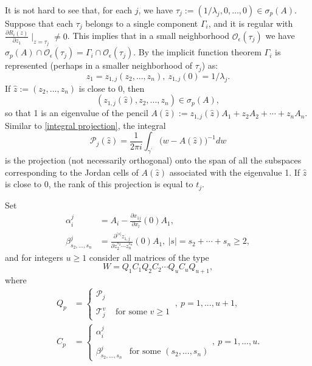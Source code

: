 \documentclass[draft, 12pt, reqno]{amsart}
\numberwithin{equation}{section}
\theoremstyle{plain}
\begin{document}
It is not hard to see that, for each $j$, we have $\tau_j:=(1/\lambda_j,0,\dots ,0)\in \sigma_p(A)$. Suppose that each $\tau_j$ belongs to a single component $\Gamma_i$, and it is regular with $\frac{\partial R_i(z)}{\partial z_1}\mid_{z=\tau_j} \neq 0$. This implies that in a small neighborhood ${\mathcal O}_\epsilon (\tau_j)$ we have $\sigma_p(A)\cap {\mathcal O}_\epsilon(\tau_j)=\Gamma_i\cap {\mathcal O}_\epsilon(\tau_j)$.
By the implicit function theorem $\Gamma_i$ is represented (perhaps in a smaller neighborhood of $\tau_j$) as: 
\begin{equation}\label{implicit}
z_1=z_{1,j}(z_2,...,z_{n}), \ z_{1,j}(0)=1/\lambda_j. 
\end{equation}
If $\hat{z}:=(z_2,...,z_n)$ is close to 0, then 
$$(z_{1,j}(\hat{z}),z_2,...,z_n)\in \sigma_p(A),$$ 
so that 1 is an eigenvalue of the pencil $A(\hat{z}):=z_{1,j}(\hat{z})A_1+z_2A_2+\cdots+z_nA_n$. Similar to \eqref{integral projection}, the integral
\begin{equation}\label{projection for pencil}
{\mathcal P}_j(\hat{z})=\frac{1}{2\pi i} \int_{\gamma^\prime}\big(w-A(\hat{z})\big)^{-1}dw	
\end{equation}
is the projection (not necessarily orthogonal) onto the span of all the subspaces corresponding to the Jordan cells of $A(\hat{z})$ associated with the eigenvalue 1. %
If $\hat{z}$ is close to 0, the rank of this projection is equal to $t_j$. 

Set
\begin{align}
\alpha_i^j&=A_i-\frac{\partial x_{1j}}{\partial x_l}(0)A_1,   \label{alpha}\\
\beta_{s_2,...,s_n}^j&= \frac{\partial ^{|s|} z_{1,j}}{\partial z_2^{s_2}\cdots z_n^{s_n} }(0)A_1, \ |s|=s_2+\cdots +s_n\geq 2, \label{beta}
\end{align}
and for integers $u\geq 1$ consider all matrices of the type
\begin{equation}\label{word}
W= Q_1C_1Q_2C_2\cdots Q_uC_uQ_{u+1},
\end{equation}
where 
\begin{align*}
Q_p&= \left\{ \begin{array}{cc} {\mathcal P}_j &  \\ & \\ {\mathcal T}_j^v & \mbox{ for some $v\geq  1$}   \
 \end{array}\right.,  \ p=1,...,u+1,  
\\
 C_p&=\left\{ \begin{array}{cc} \alpha_i^j & \\ & \\ \beta_{s_2,...,s_n}^j & \mbox{for some $(s_2,...,s_n)$}\end{array} \right ., \ p=1,...,u.
 	\end{align*}
\end{document}
